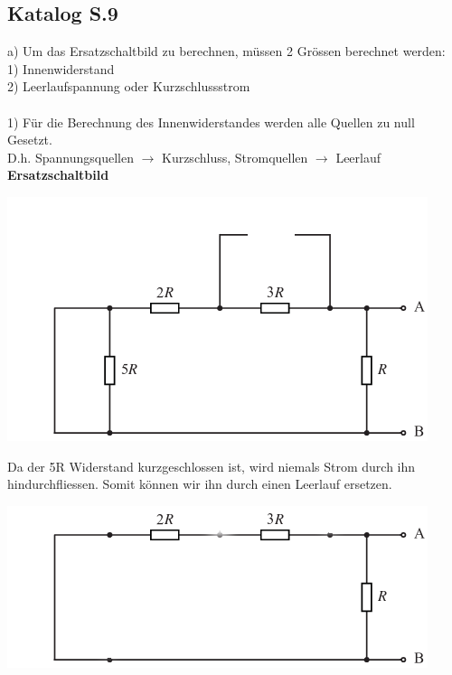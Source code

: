 \subsection{Katalog S.9}



a) Um das Ersatzschaltbild zu berechnen, müssen 2 Grössen berechnet werden: \\
1) Innenwiderstand \\
2) Leerlaufspannung oder Kurzschlussstrom \\
\\
1) Für die Berechnung des Innenwiderstandes werden alle Quellen zu null Gesetzt. \\
D.h. Spannungsquellen $\rightarrow$ Kurzschluss, Stromquellen $\rightarrow$ Leerlauf \\
\textbf{Ersatzschaltbild}


\begin{center}
  \includegraphics[scale=1.5]{katalog/katalog-1/ir-1.png} \\
\end{center}
Da der 5R Widerstand kurzgeschlossen ist, wird niemals Strom durch ihn hindurchfliessen. Somit können wir ihn durch einen Leerlauf ersetzen. \\
\begin{center}
\includegraphics[scale=1.5]{katalog/katalog-1/ir-2.png} \\
\end{center}

